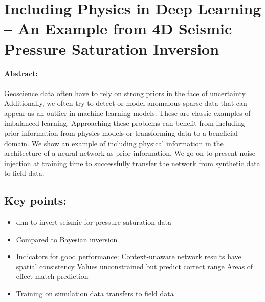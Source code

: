 \section{Including Physics in Deep Learning – An Example from 4D Seismic Pressure Saturation Inversion}

\paragraph{Abstract:} Geoscience data often have to rely on strong priors in the face of uncertainty. Additionally, we often try to detect or model anomalous sparse data that can appear as an outlier in machine learning models. These are classic examples of imbalanced learning. Approaching these problems can benefit from including prior information from physics models or transforming data to a beneficial domain. We show an example of including physical information in the architecture of a neural network as prior information. We go on to present noise injection at training time to successfully transfer the network from synthetic data to field data.
\vfill
\subsection*{Key points:}
\begin{itemize}
    \item \acl{dnn} to invert seismic for pressure-saturation data
    \item Compared to Bayesian inversion
    \item Indicators for good performance:
    \subitem Context-unaware network results have spatial consistency
    \subitem Values unconstrained but predict correct range
    \subitem Areas of effect match prediction
    \item Training on simulation data transfers to field data
\end{itemize}
\vfill
{\vfill\hfill\newline{}}

